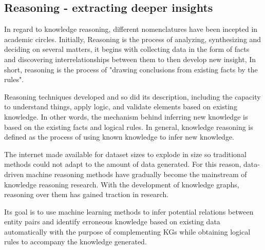 
\subsection{Reasoning - extracting deeper insights}

In regard to knowledge reasoning, different nomenclatures have been incepted in academic circles. Initially, Reasoning is the process of analyzing, synthesizing and deciding on several matters, it begins with collecting data in the form of facts and discovering interrelationships between them to then develop new insight, In short, reasoning is the process of "drawing conclusions from existing facts by the rules"\cite{sutton2018reinforcement}.

Reasoning techniques developed and so did its description, including the capacity to understand things, apply logic, and validate elements based on existing knowledge. In other words, the mechanism behind inferring new knowledge is based on the existing facts and logical rules. In general, knowledge reasoning is defined as the process of using known knowledge to infer new knowledge.

The internet made available for dataset sizes to explode in size so traditional methods could not adapt to the amount of data generated. For this reason, data-driven machine reasoning methods have gradually become the mainstream of knowledge reasoning research. With the development of knowledge graphs, reasoning over them has gained traction in research.

Its goal is to use machine learning methods to infer potential relations between entity pairs and identify erroneous knowledge based on existing data automatically with the purpose of complementing KGs while obtaining logical rules to accompany the knowledge generated.


